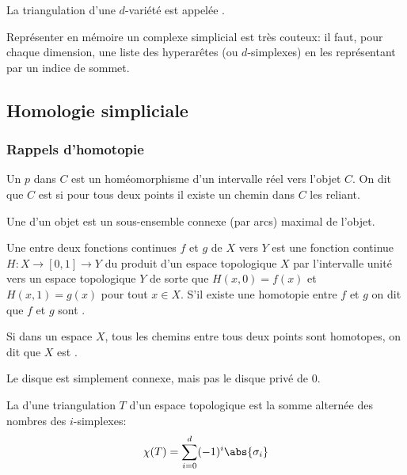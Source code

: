 \begin{definition}
	La triangulation d'une $d$-variété est appelée .
\end{definition}

Représenter en mémoire un complexe simplicial est très couteux: il faut, pour chaque dimension, une liste des hyperarêtes (ou $d$-simplexes) en les représentant par un indice de sommet.

\subsection{Homologie simpliciale}
\subsubsection{Rappels d'homotopie}
\begin{definition}
	Un  $p$ dans $C$ est un homéomorphisme d'un intervalle réel vers l'objet $C$.
	On dit que $C$ est  si pour tous deux points il existe un chemin dans $C$ les reliant.
\end{definition}

\begin{definition}
	Une  d'un objet est un sous-ensemble connexe (par arcs) maximal de l'objet.
\end{definition}

\begin{definition}
	Une  entre deux fonctions continues $f$ et $g$ de $X$ vers $Y$ est une fonction continue $H: X \to  [0, 1] \to Y$ du produit d'un espace topologique $X$ par l'intervalle unité vers un espace topologique $Y$ de sorte que $H(x, 0) = f(x)$ et $H(x, 1) = g(x)$ pour tout $x \in X$.
	S'il existe une homotopie entre $f$ et $g$ on dit que $f$ et $g$ sont .
\end{definition}

\begin{definition}
	Si dans un espace $X$, tous les chemins entre tous deux points sont homotopes, on dit que $X$ est .
\end{definition}
Le disque est simplement connexe, mais pas le disque privé de $0$.

\begin{definition}
	La  d'une triangulation $T$ d'un espace topologique est la somme alternée des nombres des $i$-simplexes:
	\begin{equation*}
		\chi(T) = \sum_{i=0}^{d} (-1)^{i}\abs{\sigma_{i}}
	\end{equation*}
\end{definition}

